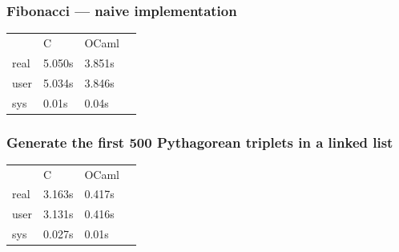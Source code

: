 \documentclass[aspectratio=169]{beamer}
\begin{document}


\begin{frame}
  \frametitle{Fibonacci --- naive implementation}
  \begin{table}
    \centering
    \begin{tabular}{llll}\label{tab:fibtab}
           & C      & OCaml  & \\
      real & 5.050s & 3.851s & \\
      user & 5.034s & 3.846s & \\
      sys  & 0.01s  & 0.04s  &
    \end{tabular}
  \end{table}
\end{frame}

\begin{frame}
  \frametitle{Generate the first 500 Pythagorean triplets in a linked list}
  \begin{table}
    \centering
    \begin{tabular}{llll}\label{tab:pythagtab}
           & C      & OCaml  & \\
      real & 3.163s & 0.417s & \\
      user & 3.131s & 0.416s & \\
      sys  & 0.027s & 0.01s  &
    \end{tabular}
  \end{table}
\end{frame}
\end{document}
